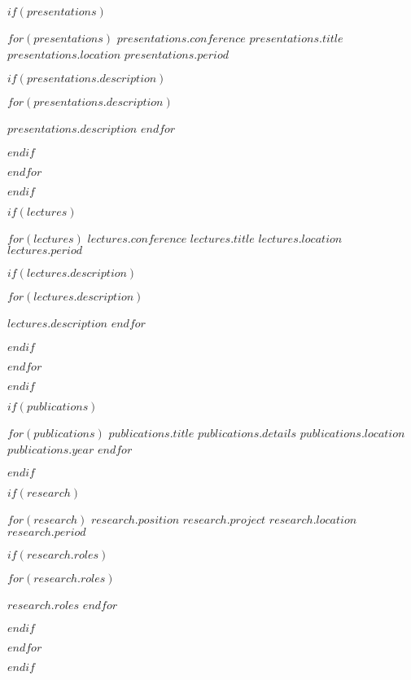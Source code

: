 \documentclass[12pt, letterpaper]{awesome-cv}
\begin{document}
$if(presentations)$
  \begin{cventries}

    $for(presentations)$
      \cventry
      {$presentations.conference$}
      {$presentations.title$}
      {$presentations.location$}
      {$presentations.period$}
      {
        $if(presentations.description)$
          \begin{cvitems}
            $for(presentations.description)$
              \item{$presentations.description$}
            $endfor$
          \end{cvitems}
        $endif$
      }

    $endfor$
  \end{cventries}
$endif$

$if(lectures)$
  \begin{cventries}

    $for(lectures)$
      \cventry
      {$lectures.conference$}
      {$lectures.title$}
      {$lectures.location$}
      {$lectures.period$}
      {
        $if(lectures.description)$
          \begin{cvitems}
            $for(lectures.description)$
              \item{$lectures.description$}
            $endfor$
          \end{cvitems}
        $endif$
      }

    $endfor$
  \end{cventries}
$endif$

$if(publications)$
  \begin{cvpublications}
    $for(publications)$
      \cvpublication
      {$publications.title$}
      {$publications.details$}
      {$publications.location$}
      {$publications.year$}
    $endfor$
\end{cvpublications}
$endif$

$if(research)$
  \begin{cventries}

    $for(research)$
      \cventry
      {$research.position$}
      {$research.project$}
      {$research.location$}
      {$research.period$}
      {
        $if(research.roles)$
          \begin{cvitems}
            $for(research.roles)$
              \item {$research.roles$}
            $endfor$
          \end{cvitems}
        $endif$
      }

    $endfor$
  \end{cventries}
$endif$
\end{document}
